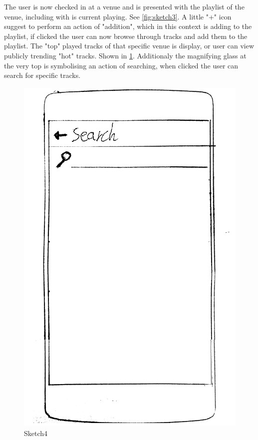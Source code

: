 The user is now checked in at a venue and is presented with the playlist of the venue, including with is current playing. See \cref{fig:sketch3}. A little "+" icon suggest to perform an action of "addition", which in this context is adding to the playlist, if clicked the user can now browse through tracks and add them to the playlist. The "top" played tracks of that specific venue is display, or user can view publicly trending "hot" tracks. Shown in \cref{fig:sketch4}. Additionaly the magnifying glass at the very top is symbolising an action of searching, when clicked the user can search for specific tracks.

\begin{figure}
  \centering
  \includegraphics[width=0.25\linewidth]{Images/sketch4.png}
  \caption{Sketch4}
  \label{fig:sketch4}
\end{figure}